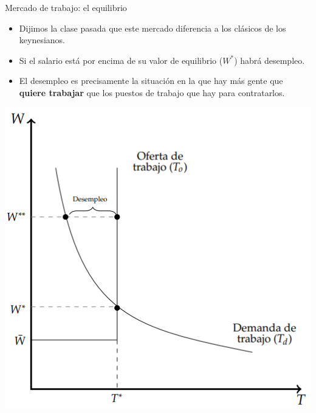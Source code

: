 \documentclass{beamer}
\begin{document}
\begin{frame}{Mercado de trabajo: el equilibrio}
\begin{itemize}
    \small
    \item Dijimos la clase pasada que este mercado diferencia a los clásicos de los keynesianos.
    \item Si el salario está por encima de su valor de equilibrio ($W^{*}$) habrá desempleo.
    \item El desempleo es precisamente la situación en la que hay más gente que \textbf{quiere trabajar} que los puestos de trabajo que hay para contratarlos.
\end{itemize}
    \centering
    \includegraphics[scale=0.5]{../Figures/C34.5.png}
\end{frame}
\end{document}
